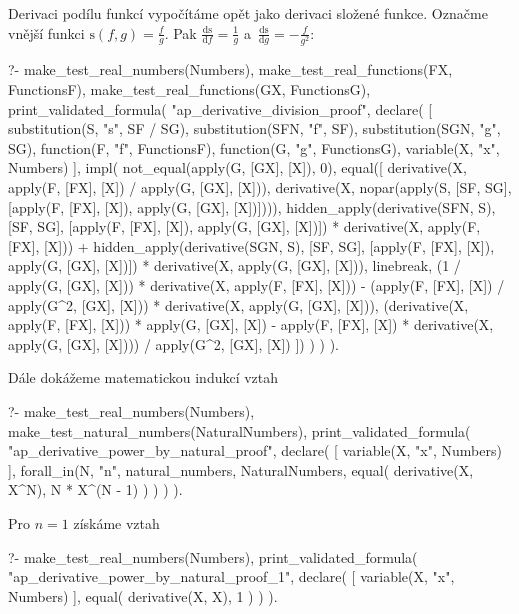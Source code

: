 Derivaci podílu funkcí vypočítáme opět jako derivaci složené funkce. Označme vnější funkci \(\mathrm{s}(f, g) = \frac{f}{g}\). Pak \(\frac{\mathrm{ds}}{\mathrm{d}f} = \frac{1}{g}\) a~\(\frac{\mathrm{ds}}{\mathrm{d}g} = -\frac{f}{g^2}\):

\begin{prolog}
?-	make_test_real_numbers(Numbers),
	make_test_real_functions(FX, FunctionsF),
	make_test_real_functions(GX, FunctionsG),
	print_validated_formula(
		"ap_derivative_division_proof",
		declare(
			[
				substitution(S, "s", SF / SG),
				substitution(SFN, "f", SF),
				substitution(SGN, "g", SG),
				function(F, "f", FunctionsF),
				function(G, "g", FunctionsG),
				variable(X, "x", Numbers)
			],
			impl(
				not_equal(apply(G, [GX], [X]), 0),
				equal([
					derivative(X, apply(F, [FX], [X]) / apply(G, [GX], [X])),
					derivative(X, nopar(apply(S, [SF, SG], [apply(F, [FX], [X]), apply(G, [GX], [X])]))),
					hidden_apply(derivative(SFN, S), [SF, SG], [apply(F, [FX], [X]), apply(G, [GX], [X])]) * derivative(X, apply(F, [FX], [X])) +
					hidden_apply(derivative(SGN, S), [SF, SG], [apply(F, [FX], [X]), apply(G, [GX], [X])]) * derivative(X, apply(G, [GX], [X])),
					linebreak,
					(1 / apply(G, [GX], [X])) * derivative(X, apply(F, [FX], [X])) -
					(apply(F, [FX], [X]) / apply(G^2, [GX], [X])) * derivative(X, apply(G, [GX], [X])),
					(derivative(X, apply(F, [FX], [X])) * apply(G, [GX], [X]) - apply(F, [FX], [X]) * derivative(X, apply(G, [GX], [X]))) / apply(G^2, [GX], [X])
				])
			)
		)
	).
\end{prolog}

Dále dokážeme matematickou indukcí vztah

\begin{prolog}
?-	make_test_real_numbers(Numbers),
	make_test_natural_numbers(NaturalNumbers),
	print_validated_formula(
		"ap_derivative_power_by_natural_proof",
		declare(
			[
				variable(X, "x", Numbers)
			],
			forall_in(N, "n", natural_numbers, NaturalNumbers, 
				equal(
					derivative(X, X^N),
					N * X^(N - 1)
				)
			)
		)
	).
\end{prolog}

Pro \(n = 1\) získáme vztah 

\begin{prolog}
?-	make_test_real_numbers(Numbers),
	print_validated_formula(
		"ap_derivative_power_by_natural_proof_1",
		declare(
			[
				variable(X, "x", Numbers)
			],
			equal(
				derivative(X, X),
				1
			)
		)
	).
\end{prolog}

